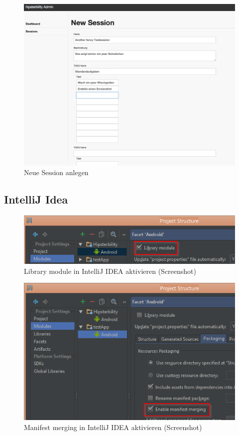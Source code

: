 \begin{figure}[h!]
	\centering
		\includegraphics[width=\linewidth,keepaspectratio]{img/session-create-page.png}
	\caption{Neue Session anlegen}
	\label{fig: session-create-page}
\end{figure}

\newpage

\subsection{IntelliJ Idea\label{apdx:intellij}}
\begin{figure}[h!]
\includegraphics[width=\linewidth]{img/screen_intellij_library_module}
\caption{Library module in IntelliJ IDEA aktivieren (Screenshot)}
\label{fig:screen_intellij_library_module}
\end{figure}

\begin{figure}[h!]
\includegraphics[width=\linewidth]{img/screen_intellij_manifest_merging}
\caption{Manifest merging in IntelliJ IDEA aktivieren (Screenshot)}
\label{fig:screen_intellij_maifest_merging}
\end{figure}